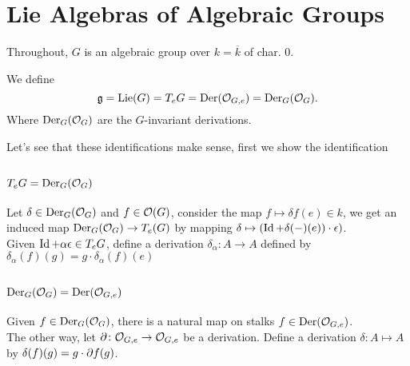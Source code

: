 \documentclass[../main.tex]{subfiles}
\begin{document}
\section{Lie Algebras of Algebraic Groups}

Throughout, $G$ is an algebraic group over $k = \overline{k} $ of char. 0.\\
\begin{defn}
	We define
	\[
		\mathfrak{g} = \mathrm{Lie}( G) = T_e G = \mathrm{Der}( \mathcal{O}_{G,e} ) = \mathrm{Der}_G( \mathcal{O}_{G} ).
\]
Where $\mathrm{Der}_G( \mathcal{O}_G) $ are the $G$-invariant derivations.
\end{defn}
Let's see that these identifications make sense, first we show the identification 
\subsection*{$T_e G = \mathrm{Der}_{G} ( \mathcal{O}_G) $ }
Let $\delta\in \mathrm{Der}_G( \mathcal{O}_G) $ and $f \in \mathcal{O}( G)$, consider the map $f \mapsto \delta f ( e ) \in k$, we get an induced map $\mathrm{Der}_G( \mathcal{O}_G) \to T_e ( G) $ by mapping $\delta\mapsto ( \operatorname*{Id} +\delta( -)( e ))   \cdot \epsilon ) $.\\
Given $\operatorname*{Id}+\alpha\epsilon\in T_e G$, define a derivation $\delta_\alpha\colon A \to A$ defined by $\delta_\alpha( f) ( g) = g\cdot \delta_\alpha( f) ( e )$ 
\subsection*{$\mathrm{Der}_G( \mathcal{O}_G) = \mathrm{Der}( \mathcal{O}_{G,e} ) $ }
Given $f \in \mathrm{Der}_G( \mathcal{O}_G) $, there is a natural map on stalks $f\in \mathrm{Der}( \mathcal{O}_{G,e} ) $.\\
The other way, let $\partial\colon \mathcal{O}_{G,e} \to \mathcal{O}_{G,e} $ be a derivation. Define a derivation $\delta\colon A \mapsto A$ by $\delta( f) ( g) = g \cdot \partial f ( g) $.\\
\end{document}
